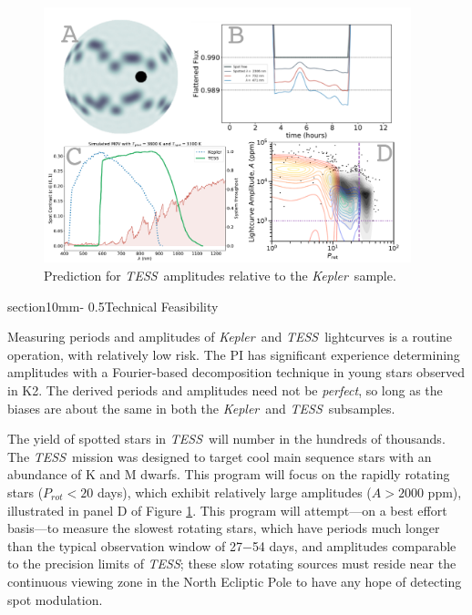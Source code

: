\documentclass[letterpaper,11pt]{article}
\makeatletter
\renewcommand{\section}{\@startsection%
{section}{1}{0mm}{-\baselineskip}%
{0.5\baselineskip}{\normalfont\Large\bfseries}}%
\newcommand{\tess}{{\it TESS}}
\newcommand{\kepler}{{\it Kepler}}
\newcommand{\ktwo}{{K2}}
\makeatother
\begin{document}
\begin{figure}
\includegraphics[width=0.95\textwidth]{figures/multi_panel.pdf}
\caption{Prediction for \tess\ amplitudes relative to the \kepler\ sample.}
\label{fig:predictAmps}
\end{figure}

\section{Technical Feasibility}

Measuring periods and amplitudes of \kepler\ and \tess\ lightcurves is a routine operation, with relatively low risk.  The PI has significant experience determining amplitudes with a Fourier-based decomposition technique in young stars observed in \ktwo.  The derived periods and amplitudes need not be \emph{perfect}, so long as the biases are about the same in both the \kepler\ and \tess\ subsamples.

The yield of spotted stars in \tess\ will number in the hundreds of thousands.  The \tess\ mission was designed to target cool main sequence stars with an abundance of K and M dwarfs.  This program will focus on the rapidly rotating stars ($P_{rot}<20$ days), which exhibit relatively large amplitudes ($A>2000$ ppm), illustrated in panel D of Figure \ref{fig:predictAmps}.  This program will attempt---on a best effort basis---to measure the slowest rotating stars, which have periods much longer than the typical observation window of 27$-$54 days, and amplitudes comparable to the precision limits of \tess; these slow rotating sources must reside near the continuous viewing zone in the North Ecliptic Pole to have any hope of detecting spot modulation.
\end{document}
